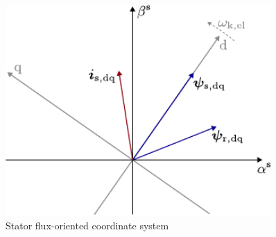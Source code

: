 \begin{frame}
\begin{columns}
\begin{column}{0.5\textwidth}
\begin{figure}
                \includegraphics[width=0.9\textwidth]{fig/lec06/K_coordinates_stator_flux_orientation.pdf}
                \caption{Stator flux-oriented coordinate system}
                \label{fig:K_coordinates_stator_flux_orientation}
            \end{figure}
        \end{column}
    \end{columns}
\end{frame}

